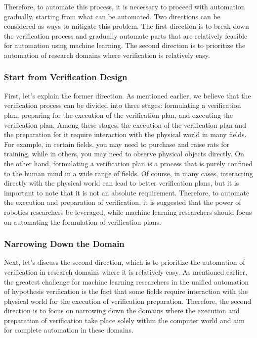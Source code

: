 \documentclass{book}
\begin{document}
Therefore, to automate this process, it is necessary to proceed with automation gradually, starting from what can be automated. Two directions can be considered as ways to mitigate this problem. The first direction is to break down the verification process and gradually automate parts that are relatively feasible for automation using machine learning. The second direction is to prioritize the automation of research domains where verification is relatively easy. 

\subsubsection{Start from Verification Design}

First, let's explain the former direction. As mentioned earlier, we believe that the verification process can be divided into three stages: formulating a verification plan, preparing for the execution of the verification plan, and executing the verification plan. Among these stages, the execution of the verification plan and the preparation for it require interaction with the physical world in many fields. For example, in certain fields, you may need to purchase and raise rats for training, while in others, you may need to observe physical objects directly. On the other hand, formulating a verification plan is a process that is purely confined to the human mind in a wide range of fields. Of course, in many cases, interacting directly with the physical world can lead to better verification plans, but it is important to note that it is not an absolute requirement. Therefore, to automate the execution and preparation of verification, it is suggested that the power of robotics researchers be leveraged, while machine learning researchers should focus on automating the formulation of verification plans. 

\subsubsection{Narrowing Down the Domain}

Next, let's discuss the second direction, which is to prioritize the automation of verification in research domains where it is relatively easy. As mentioned earlier, the greatest challenge for machine learning researchers in the unified automation of hypothesis verification is the fact that some fields require interaction with the physical world for the execution of verification preparation. Therefore, the second direction is to focus on narrowing down the domains where the execution and preparation of verification take place solely within the computer world and aim for complete automation in these domains.
\end{document}

